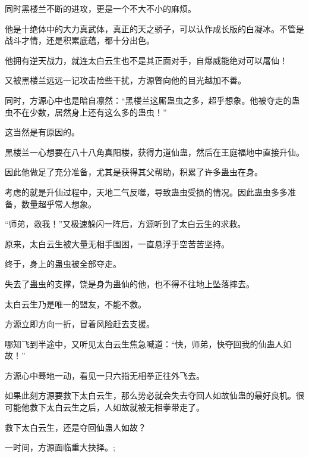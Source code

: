 \begin{this_body}
同时黑楼兰不断的进攻，更是一个不大不小的麻烦。

他是十绝体中的大力真武体，真正的天之骄子，可以认作成长版的白凝冰。不管是战斗才情，还是积累底蕴，都十分出色。

他拥有逆天战力，就连太白云生也不是其正面对手，自爆威能绝对可以屠仙！

又被黑楼兰远远一记攻击险些干扰，方源瞥向他的目光越加不善。

同时，方源心中也是暗自凛然：“黑楼兰这厮蛊虫之多，超乎想象。他被夺走的蛊虫不在少数，居然身上还有这么多的蛊虫！”

这当然是有原因的。

黑楼兰一心想要在八十八角真阳楼，获得力道仙蛊，然后在王庭福地中直接升仙。

因此他做足了充分准备，尤其是获得其父帮助，积累了许多蛊虫在身。

考虑的就是升仙过程中，天地二气反噬，导致蛊虫受损的情况。因此蛊虫多多准备，数量超乎常人想象。

“师弟，救我！”又极速躲闪一阵后，方源听到了太白云生的求救。

原来，太白云生被大量无相手围困，一直悬浮于空苦苦坚持。

终于，身上的蛊虫被全部夺走。

失去了蛊虫的支撑，饶是身为蛊仙的他，也不得不往地上坠落摔去。

太白云生乃是唯一的盟友，不能不救。

方源立即方向一折，冒着风险赶去支援。

哪知飞到半途中，又听见太白云生焦急喊道：“快，师弟，快夺回我的仙蛊人如故！”

方源心中蓦地一动，看见一只六指无相拳正往外飞去。

如果此刻方源要救下太白云生，那么势必就会失去夺回人如故仙蛊的最好良机。很可能他救下太白云生之后，人如故就被无相拳带走了。

救下太白云生，还是夺回仙蛊人如故？

一时间，方源面临重大抉择。;

\end{this_body}

